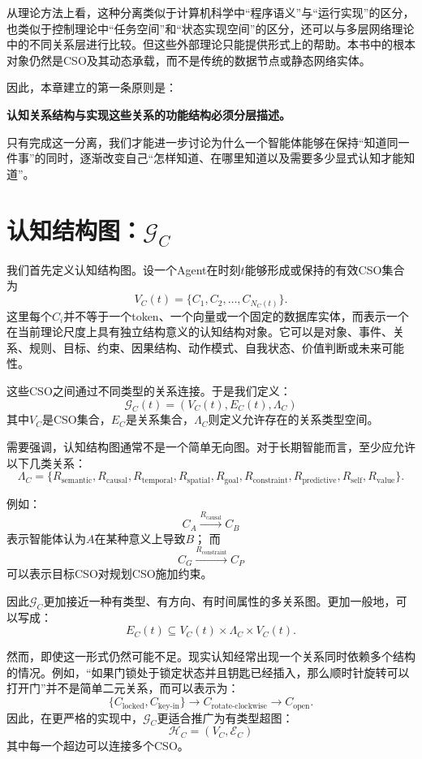 从理论方法上看，这种分离类似于计算机科学中“程序语义”与“运行实现”的区分，也类似于控制理论中“任务空间”和“状态实现空间”的区分，还可以与多层网络理论中的不同关系层进行比较。但这些外部理论只能提供形式上的帮助。本书中的根本对象仍然是CSO及其动态承载，而不是传统的数据节点或静态网络实体。

因此，本章建立的第一条原则是：
\begin{proposition*}
\bfseries 认知关系结构与实现这些关系的功能结构必须分层描述。
\end{proposition*}

只有完成这一分离，我们才能进一步讨论为什么一个智能体能够在保持“知道同一件事”的同时，逐渐改变自己“怎样知道、在哪里知道以及需要多少显式认知才能知道”。

\section{认知结构图：$\mathcal G_C$}

我们首先定义认知结构图。设一个Agent在时刻$t$能够形成或保持的有效CSO集合为
\[
V_C(t)=\{C_1,C_2,\ldots,C_{N_C(t)}\}.
\]
这里每个$C_i$并不等于一个token、一个向量或一个固定的数据库实体，而表示一个在当前理论尺度上具有独立结构意义的认知结构对象。它可以是对象、事件、关系、规则、目标、约束、因果结构、动作模式、自我状态、价值判断或未来可能性。

这些CSO之间通过不同类型的关系连接。于是我们定义：
\[
\boxed{
\mathcal G_C(t)
=
\left(
V_C(t),
E_C(t),
\Lambda_C
\right)
}
\]
其中$V_C$是CSO集合，$E_C$是关系集合，$\Lambda_C$则定义允许存在的关系类型空间。

需要强调，认知结构图通常不是一个简单无向图。对于长期智能而言，至少应允许以下几类关系：
\[
\Lambda_C
=
\{
R_{\text{semantic}},
R_{\text{causal}},
R_{\text{temporal}},
R_{\text{spatial}},
R_{\text{goal}},
R_{\text{constraint}},
R_{\text{predictive}},
R_{\text{self}},
R_{\text{value}}
\}.
\]

例如：
\[
C_A
\xrightarrow{R_{\text{causal}}}
C_B
\]
表示智能体认为$A$在某种意义上导致$B$；
而
\[
C_G
\xrightarrow{R_{\text{constraint}}}
C_P
\]
可以表示目标CSO对规划CSO施加约束。

因此$\mathcal G_C$更加接近一种有类型、有方向、有时间属性的多关系图。更加一般地，可以写成：
\[
E_C(t)
\subseteq
V_C(t)
\times
\Lambda_C
\times
V_C(t).
\]

然而，即使这一形式仍然可能不足。现实认知经常出现一个关系同时依赖多个结构的情况。例如，“如果门锁处于锁定状态并且钥匙已经插入，那么顺时针旋转可以打开门”并不是简单二元关系，而可以表示为：
\[
\{C_{\text{locked}},C_{\text{key-in}}\}
\rightarrow
C_{\text{rotate-clockwise}}
\rightarrow
C_{\text{open}}.
\]
因此，在更严格的实现中，$\mathcal G_C$更适合推广为有类型超图：
\[
\boxed{
\mathcal H_C
=
(V_C,\mathcal E_C)
}
\]
其中每一个超边可以连接多个CSO。

